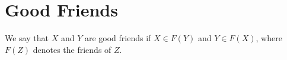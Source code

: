 %
%

\section{Good Friends}
We say that $X$ and $Y$ are good friends if $X \in F(Y)$ and $Y \in F(X)$,
where $F(Z)$ denotes the friends of $Z$.

